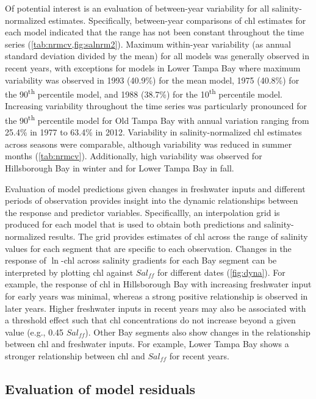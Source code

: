 \documentclass{svjour3}\usepackage[]{graphicx}\usepackage[]{color}
\newcommand{\nine}{90\textsuperscript{th} percentile }
\newcommand{\ten}{10\textsuperscript{th} percentile }
\begin{document}
Of potential interest is an evaluation of between-year variability for all salinity-normalized estimates.  Specifically, between-year comparisons of \ac{chl} estimates for each model indicated that the range has not been constant throughout the time series (\cref{tab:nrmcv,fig:salnrm2}).  Maximum within-year variability (as annual standard deviation divided by the mean) for all models was generally observed in recent years, with exceptions for models in Lower Tampa Bay where maximum variability was observed in 1993 (40.9\%) for the mean model, 1975 (40.8\%) for the \nine model, and 1988 (38.7\%) for the \ten model.  Increasing variability throughout the time series was particularly pronounced for the \nine model for Old Tampa Bay with annual variation ranging from 25.4\% in 1977  to 63.4\% in 2012.  Variability in salinity-normalized \ac{chl} estimates across seasons were comparable, although variability was reduced in summer months (\cref{tab:nrmcv}).  Additionally, high variability was observed for Hillsborough Bay in winter and for Lower Tampa Bay in fall.

Evaluation of model predictions given changes in freshwater inputs and different periods of observation provides insight into the dynamic relationships between the response and predictor variables. Specificallly, an interpolation grid is produced for each model that is used to obtain both predictions and salinity-normalized results.  The grid provides estimates of \ac{chl} across the range of salinity values for each segment that are specific to each observation.  Changes in the response of $\ln$-\ac{chl} across salinity gradients for each Bay segment can be interpreted by plotting \ac{chl} against $Sal_{ff}$ for different dates (\cref{fig:dyna}).  For example, the response of \ac{chl} in Hillsborough Bay with increasing freshwater input for early years was minimal, whereas a strong positive relationship is observed in later years.  Higher freshwater inputs in recent years may also be associated with a threshold effect such that \ac{chl} concentrations do not increase beyond a given value (e.g., 0.45 $Sal_{ff}$).  Other Bay segments also show changes in the relationship between \ac{chl} and freshwater inputs.  For example, Lower Tampa Bay shows a stronger relationship between \ac{chl} and $Sal_{ff}$ for recent years. 

\subsection{Evaluation of model residuals}
\end{document}
